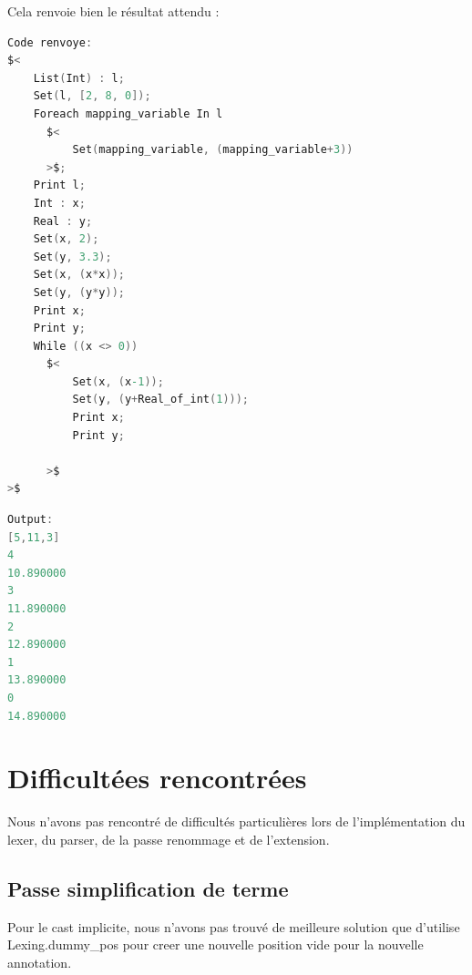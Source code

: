 \documentclass{report}
\begin{document}
    Cela renvoie bien le résultat attendu : \\

    \begin{lstlisting}[language=C, basicstyle=\ttfamily]
Code renvoye:
$<
    List(Int) : l;
    Set(l, [2, 8, 0]);
    Foreach mapping_variable In l
      $<
          Set(mapping_variable, (mapping_variable+3))
      >$;
    Print l;
    Int : x;
    Real : y;
    Set(x, 2);
    Set(y, 3.3);
    Set(x, (x*x));
    Set(y, (y*y));
    Print x;
    Print y;
    While ((x <> 0))
      $<
          Set(x, (x-1));
          Set(y, (y+Real_of_int(1)));
          Print x;
          Print y;
          
      >$
>$
    \end{lstlisting}

    \begin{lstlisting}[language=C, basicstyle=\ttfamily]
Output:
[5,11,3]
4
10.890000
3
11.890000
2
12.890000
1
13.890000
0
14.890000      
    \end{lstlisting}

    \newpage

\chapter{Difficultées rencontrées}

   \quad Nous n'avons pas rencontré de difficultés particulières lors de l'implémentation du lexer, du parser, de la passe renommage et de l'extension.\\

    \section{Passe simplification de terme}

    Pour le cast implicite, nous n'avons pas trouvé de meilleure solution que d'utilise Lexing.dummy\_pos pour creer une nouvelle position vide pour la nouvelle annotation.\\
\end{document}
